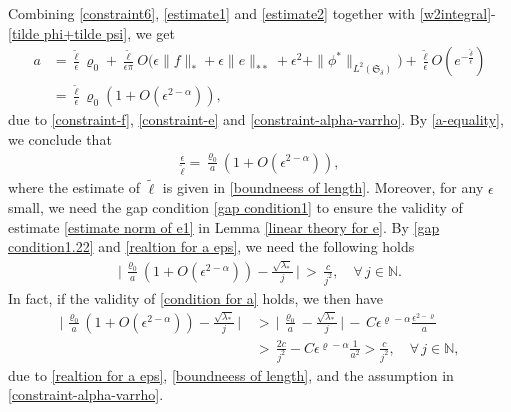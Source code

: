 \documentclass[10pt, reqno]{amsart}
\numberwithin{equation}{section}
\theoremstyle{definition}
\begin{document}
{\medskip
 Combining \eqref{constraint6}, \eqref{estimate1} and \eqref{estimate2} together with \eqref{w2integral}-\eqref{tilde phi+tilde psi}, we get
\begin{align} \label{a-equality}
a &= \frac {\tilde \ell} {\epsilon} \varrho_0
+\frac {\tilde \ell} {\epsilon\pi} O\Big(\epsilon\|f\|_* +\epsilon \|e\|_{**} +\epsilon^2 +\|\phi^*\|_{L^2(\mathfrak S_\delta)} \Big)
+ \frac{\tilde \ell} \epsilon O\left(e^{-\frac{\tilde \delta}\epsilon} \right)
\nonumber\\[2mm]
& = \frac {\tilde \ell} {\epsilon} \varrho_0 \left(1+ O\left(\epsilon^{2-\alpha}\right) \right),
\end{align}
due to \eqref{constraint-f}, \eqref{constraint-e} and \eqref{constraint-alpha-varrho}.
 By \eqref{a-equality}, we conclude that
\begin{align} \label{realtion for a eps}
 \frac\epsilon{\tilde \ell} = \frac{\varrho_0}{a} \left(1+ O\left(\epsilon^{2-\alpha}\right) \right),
\end{align}
where the estimate of ${\tilde\ell}$ is given in \eqref{boundneess of length}.
Moreover, for any $\epsilon$ small, we need the gap condition \eqref{gap condition1}
to ensure the validity of estimate \eqref{estimate norm of e1} in Lemma \ref{linear theory for e}.
By \eqref{gap condition1.22} and \eqref{realtion for a eps},
we need the following holds
\begin{align*}
\Bigg|\, \frac{\varrho_0}{a} \left(1+ O\left(\epsilon^{2-\alpha}\right) \right) - \frac{\sqrt{\lambda_*}} {j}\, \Bigg|
\,>\,
\frac{c} {j^2},
\quad \forall\,j \in {\mathbb N}.
\end{align*}
In fact, if the validity of \eqref{condition for a} holds, we then have
\begin{align*}
\Bigg|\, \frac{\varrho_0}{a} \left(1+ O\left(\epsilon^{2-\alpha}\right) \right)- \frac{\sqrt{\lambda_*}} {j}\, \Bigg|
&\,>\,
\Bigg|\, \frac{\varrho_0} a - \frac{\sqrt{\lambda_*}} {j}\, \Bigg|
\,-\,
C \epsilon^{\varrho-\alpha} \frac {\epsilon^{2-\varrho}} {a}
\nonumber\\[2mm]
&
\,>\, \frac{2c} {j^2}-C\epsilon^{\varrho-\alpha} \frac {1} {a^2} >\frac{c} {j^2},
\quad \forall\,j \in {\mathbb N},
\end{align*}
due to \eqref{realtion for a eps}, \eqref{boundneess of length},  and the assumption in \eqref{constraint-alpha-varrho}.





\medskip
\begin{appendix}



\end{appendix}}
\end{document}
